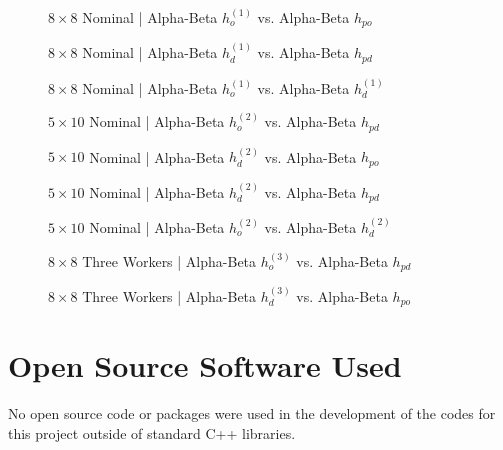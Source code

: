 \documentclass{article}[12pt]
\begin{document}
\begin{appendices}
\begin{figure}[!htb]
	\centering
	\caption{$8 \times 8$ Nominal | Alpha-Beta $h_{o}^{(1)}$ vs. Alpha-Beta $h_{po}$}
\end{figure}

\begin{figure}[!htb]
	\centering
	\caption{$8 \times 8$ Nominal | Alpha-Beta $h_{d}^{(1)}$ vs. Alpha-Beta $h_{pd}$}
\end{figure}

\begin{figure}[!htb]
	\centering
	\caption{$8 \times 8$ Nominal | Alpha-Beta $h_{o}^{(1)}$ vs. Alpha-Beta $h_{d}^{(1)}$}
\end{figure}

\begin{figure}[!htb]
	\centering
	\caption{$5 \times 10$ Nominal | Alpha-Beta $h_{o}^{(2)}$ vs. Alpha-Beta $h_{pd}$}
\end{figure}

\begin{figure}[!htb]
	\centering
	\caption{$5 \times 10$ Nominal | Alpha-Beta $h_{d}^{(2)}$ vs. Alpha-Beta $h_{po}$}
\end{figure}

\begin{figure}[!htb]
	\centering
	\caption{$5 \times 10$ Nominal | Alpha-Beta $h_{d}^{(2)}$ vs. Alpha-Beta $h_{pd}$}
\end{figure}

\begin{figure}[!htb]
	\centering
	\caption{$5 \times 10$ Nominal | Alpha-Beta $h_{o}^{(2)}$ vs. Alpha-Beta $h_{d}^{(2)}$}
\end{figure}

\begin{figure}[!htb]
	\centering
	\caption{$8 \times8 $ Three Workers | Alpha-Beta $h_{o}^{(3)}$ vs. Alpha-Beta $h_{pd}$}
\end{figure}

\begin{figure}[!htb]
	\centering
	\caption{$8 \times8 $ Three Workers | Alpha-Beta $h_{d}^{(3)}$ vs. Alpha-Beta $h_{po}$}
\end{figure}


   
   \section{Open Source Software Used}
   No open source code or packages were used in the development of the codes for this project outside of standard C++ libraries.

\end{appendices}   
   
   
   
\end{document}

